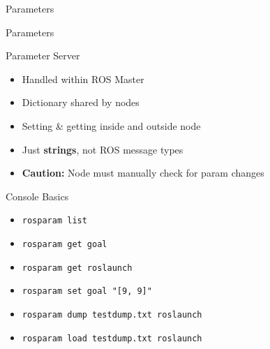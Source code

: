 \documentclass[9pt]{beamer}
\begin{document}
\begin{section}{Parameters}
    \begin{frame}{Parameters}
        \begin{block}{Parameter Server}
            \begin{itemize}
                \item Handled within ROS Master
                \item Dictionary shared by nodes
                \item Setting \& getting inside and outside node
                \item Just \textbf{strings}, not ROS message types
                \item \textbf{Caution:} Node must manually check for param changes
            \end{itemize}
        \end{block}
        \begin{block}{Console Basics}
            \begin{itemize}
                \item[] \lstinline{rosparam list}
                \item[] \lstinline{rosparam get goal}
                \item[] \lstinline{rosparam get roslaunch}
                \item[] \lstinline{rosparam set goal "[9, 9]"}
                \item[] \lstinline{rosparam dump testdump.txt roslaunch}
                \item[] \lstinline{rosparam load testdump.txt roslaunch}
            \end{itemize}
        \end{block}        
    \end{frame}
\end{section}
\end{document}
